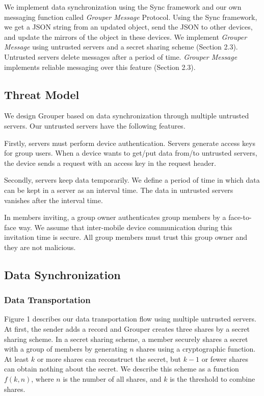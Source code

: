 \documentclass[twocolumn,10pt]{article}
\begin{document}
We implement data synchronization using the Sync framework\cite{sync} and our own messaging function called \emph{Grouper Message} Protocol.
Using the Sync framework, we get a JSON string from an updated object, send the JSON to other devices, and update the mirrors of the object in these devices. 
We implement \emph{Grouper Message} using untrusted servers and a secret sharing scheme  (Section 2.3). 
Untrusted servers delete messages after a period of time. 
\emph{Grouper Message} implements reliable messaging over this feature (Section 2.3).

\subsection{Threat Model}

We design Grouper based on data synchronization through multiple untrusted servers. Our untrusted servers have the following features.

Firstly, servers must perform device authentication. 
Servers generate access keys for group users. 
When a device wants to get/put data from/to untrusted servers, the device sends a request with an access key in the request header.

Secondly, servers keep data temporarily.
We define a period of time in which data can be kept in a server as an interval time. 
The data in untrusted servers vanishes after the interval time.

In members inviting, a group owner authenticates group members by a face-to-face way. We assume that inter-mobile device communication during this invitation time is secure. All group members must trust this group owner and they are not malicious.

\subsection{Data Synchronization}

\subsubsection{Data Transportation}

Figure 1 describes our data transportation flow using multiple untrusted servers. 
At first, the sender adds a record and Grouper creates three shares by a secret sharing scheme. 
In a secret sharing scheme, a member securely shares a secret with a group of members by generating $n$ shares using a cryptographic function. 
At least $k$ or more shares can reconstruct the secret, but $k-1$ or fewer shares can obtain nothing about the secret\cite{pang2005new}. 
We describe this scheme as a function $f(k, n)$, where $n$ is the number of all shares, and $k$ is the threshold to combine shares. 
 
\end{document}
